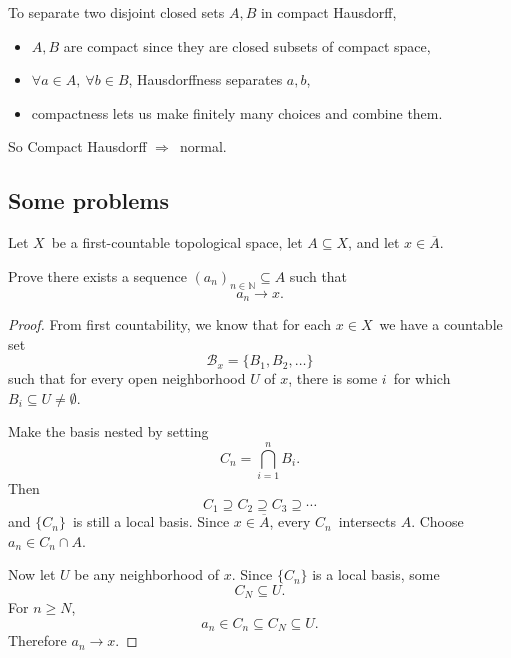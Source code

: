 \documentclass[11pt]{article}
\begin{document}
To separate two disjoint closed sets $A,B$ in 
compact Hausdorff,
\begin{itemize}
    \item $A,B$ are compact since they are closed subsets of compact space, 
    \item $\forall a \in A, \ \forall b \in B$, Hausdorffness separates $a,b$, 
    \item compactness lets us make finitely many choices and combine them. 
\end{itemize}

So Compact Hausdorff $\Rightarrow$ normal. 

\subsection{Some problems}

\begin{prob}
    Let $X$ be a first-countable 
    topological space, let $A \subseteq X$, 
    and let $x \in \overline A$. 

    Prove there exists a sequence 
    $(a_n)_{n\in\mathbb N} \subseteq A$ 
    such that 
    \[
        a_n \to x. 
    \]
\end{prob}
\begin{proof}
    From first countability, we know that 
    for each $x \in X$ we have a countable set 
    \[
        \mathcal B_x = \{B_1,B_2,\ldots\}
    \]
    such that for every open neighborhood $U$ of $x$, 
    there is some $i$ for which 
    $B_i \subseteq U \neq \emptyset$. 

    Make the basis nested by setting 
    \[
        C_n = \bigcap_{i=1}^n B_i.
    \]
    Then 
    \[
        C_1 \supseteq C_2 \supseteq C_3 \supseteq \cdots 
    \]
    and $\{C_n\}$ is still a local basis. 
    Since $x \in \overline A$, every $C_n$ intersects $A$. 
    Choose $a_n \in C_n \cap A$. 
    
    Now let $U$ be any neighborhood of $x$. Since 
    $\{C_n\}$ is a local basis, some 
    \[
        C_N \subseteq U. 
    \]
    For $n \geq N$, 
    \[
        a_n \in C_n \subseteq C_N \subseteq U. 
    \]
    Therefore $a_n \to x$. 
\end{proof}
\end{document}
